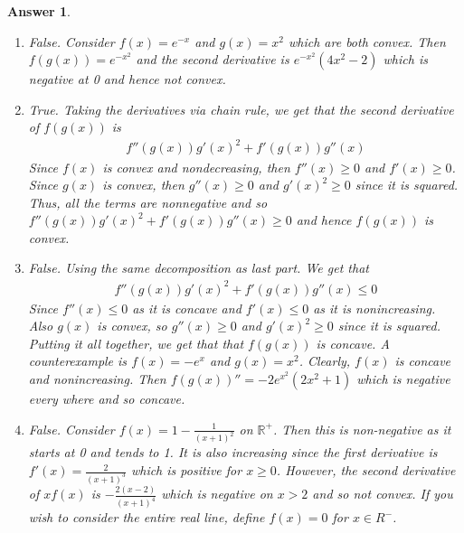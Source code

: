 \documentclass[12pt]{article}
\theoremstyle{colon}
\newtheorem*{answer}{Answer}
\begin{document}
\begin{answer}
  \leavevmode
  \begin{enumerate}[label=\arabic*)]
    \item False. Consider $f(x) = e^{-x}$ and $g(x) = x^2$ which are both convex. Then $f(g(x)) = e^{-x^2}$ and the second derivative is $e^{-x^2}(4x^2-2)$ which is negative at 0 and hence not convex.
    \item True. Taking the derivatives via chain rule, we get that the second derivative of $f(g(x))$ is
      \begin{gather*}
        f''(g(x))g'(x)^2 + f'(g(x))g''(x)
      \end{gather*}
      Since $f(x)$ is convex and nondecreasing, then $f''(x) \geq 0$ and $f'(x) \geq 0$. Since $g(x)$ is convex, then $g''(x) \geq 0$ and $g'(x)^2 \geq 0$ since it is squared. Thus, all the terms are nonnegative and so $f''(g(x))g'(x)^2 + f'(g(x))g''(x) \geq 0$ and hence $f(g(x))$ is convex.
    \item False. Using the same decomposition as last part. We get that
      \begin{gather*}
       f''(g(x))g'(x)^2 + f'(g(x))g''(x) \leq 0
      \end{gather*}
      Since $f''(x) \leq 0$ as it is concave and $f'(x) \leq 0$ as it is nonincreasing. Also $g(x)$ is convex, so $g''(x) \geq 0$ and $g'(x)^2 \geq 0$ since it is squared. Putting it all together, we get that that $f(g(x))$ is concave. A counterexample is $f(x) = -e^x$ and $g(x) = x^2$. Clearly, $f(x)$ is concave and nonincreasing. Then $f(g(x))'' = -2e^{x^2}(2x^2+1)$ which is negative every where and so concave.
    \item False. Consider $f(x) = 1 - \frac{1}{(x+1)^2}$ on $\mathbb{R}^+$. Then this is non-negative as it starts at 0 and tends to 1. It is also increasing since the first derivative is $f'(x) = \frac{2}{(x+1)^3}$ which is positive for $x \geq 0$. However, the second derivative of $xf(x)$ is $-\frac{2(x-2)}{(x+1)^4}$ which is negative on $x > 2$ and so not convex. If you wish to consider the entire real line, define $f(x) = 0$ for $x \in R^-$.
  \end{enumerate}
\end{answer}
\end{document}
